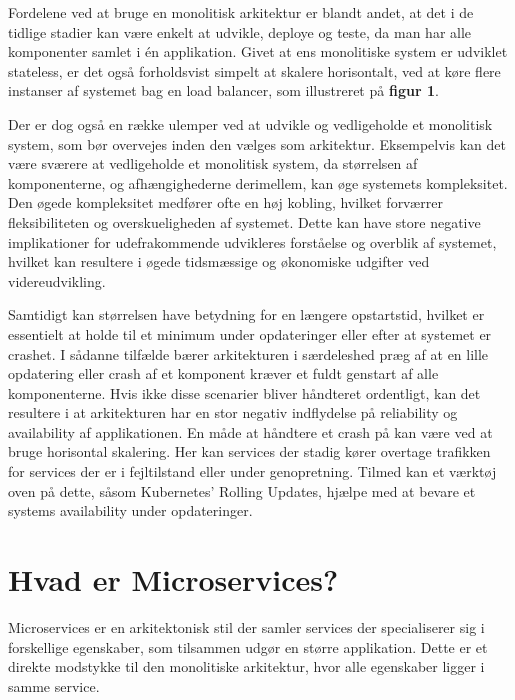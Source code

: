 \documentclass{article}
\begin{document}
\begin{flushleft}
Fordelene ved at bruge en monolitisk arkitektur er blandt andet, at det i de tidlige stadier kan være enkelt at udvikle, deploye og teste, da man har alle komponenter samlet i én applikation.\cite{mono1} Givet at ens monolitiske system er udviklet stateless, er det også forholdsvist simpelt at skalere horisontalt, ved at køre flere instanser af systemet bag en load balancer, som illustreret på \textbf{figur 1}.\cite{mono2} \linebreak

Der er dog også en række ulemper ved at udvikle og vedligeholde et monolitisk system, som bør overvejes inden den vælges som arkitektur. Eksempelvis kan det være sværere at vedligeholde et monolitisk system, da størrelsen af komponenterne, og afhængighederne derimellem, kan øge systemets kompleksitet. Den øgede kompleksitet medfører ofte en høj kobling, hvilket forværrer fleksibiliteten og overskueligheden af systemet.\cite{mono3} Dette kan have store negative implikationer for udefrakommende udvikleres forståelse og overblik af systemet, hvilket kan resultere i øgede tidsmæssige og økonomiske udgifter ved videreudvikling.\cite{mono4} \linebreak

Samtidigt kan størrelsen have betydning for en længere opstartstid, hvilket er essentielt at holde til et minimum under opdateringer eller efter at systemet er crashet. I sådanne tilfælde bærer arkitekturen i særdeleshed præg af at en lille opdatering eller crash af et komponent kræver et fuldt genstart af alle komponenterne.\cite{mono5} Hvis ikke disse scenarier bliver håndteret ordentligt, kan det resultere i at arkitekturen har en stor negativ indflydelse på reliability og availability af applikationen. En måde at håndtere et crash på kan være ved at bruge horisontal skalering. Her kan services der stadig kører overtage trafikken for services der er i fejltilstand eller under genopretning. Tilmed kan et værktøj oven på dette, såsom Kubernetes’ Rolling Updates\cite{micro2}, hjælpe med at bevare et systems availability under opdateringer. 

\section*{Hvad er Microservices?}
Microservices er en arkitektonisk stil der samler services der specialiserer sig i forskellige egenskaber, som tilsammen udgør en større applikation. Dette er et direkte modstykke til den monolitiske arkitektur, hvor alle egenskaber ligger i samme service.\linebreak


\end{flushleft}
\end{document}
